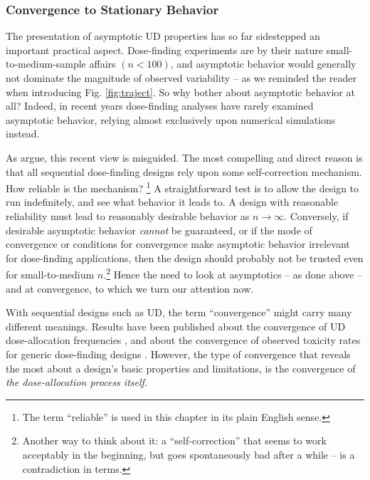 \subsubsection{Convergence to Stationary Behavior}\label{sec:geom}

The presentation of asymptotic UD properties has so far sidestepped an important practical aspect. Dose-finding experiments are by their nature small-to-medium-sample affairs $\left(n<100\right)$, and asymptotic behavior would generally not dominate the magnitude of observed variability -- as we reminded the reader when introducing Fig. \ref{fig:traject}. So why bother about asymptotic behavior at all? Indeed, in recent years dose-finding analyses have rarely examined asymptotic behavior, relying almost exclusively upon numerical simulations instead.

As \cite{oron:azri:hoff:dose:2011} argue, this recent view is misguided. The most compelling and direct reason is that all sequential dose-finding designs rely upon some self-correction mechanism. How reliable is the mechanism? \footnote{The term ``reliable'' is used in this chapter in its plain English sense.} A straightforward test is to allow the design to run indefinitely, and see what behavior it leads to. A design with reasonable reliability must lead to reasonably desirable behavior as $n\to\infty$. Conversely, if desirable asymptotic behavior \emph{cannot} be guaranteed, or if the mode of convergence or conditions for convergence make asymptotic behavior irrelevant for dose-finding applications, then the design should probably not be trusted even for small-to-medium $n$.\footnote{Another way to think about it: a ``self-correction'' that seems to work acceptably in the beginning, but goes spontaneously bad after a while -- is a contradiction in terms.} Hence the need to look at asymptotics -- as done above -- and at convergence, to which we turn our attention now.

With sequential designs such as UD, the term ``convergence'' might carry many different meanings. Results have been published about the convergence of UD dose-allocation frequencies \citep{Durh:Flou:up-a:1995,Durh:Flou:Mont:up-a:1995}, and about the convergence of observed toxicity rates for generic dose-finding designs \citep{oron:azri:hoff:dose:2011}. However, the type of convergence that reveals the most about a design's basic properties and limitations, is the convergence of \emph{the dose-allocation process itself}.

